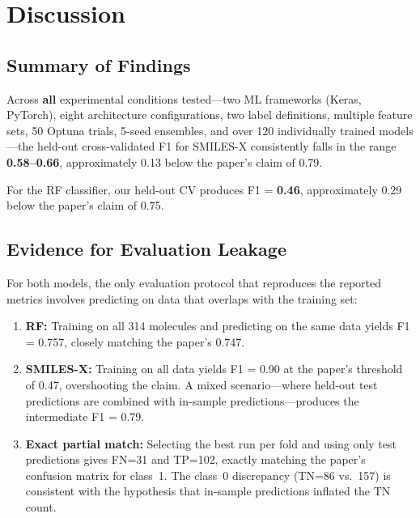 \documentclass[11pt,a4paper]{article}
\begin{document}
\section{Discussion}

\subsection{Summary of Findings}

Across \textbf{all} experimental conditions tested---two ML frameworks (Keras, PyTorch), eight architecture configurations, two label definitions, multiple feature sets, 50 Optuna trials, 5-seed ensembles, and over 120 individually trained models---the held-out cross-validated F1 for SMILES-X consistently falls in the range \textbf{0.58--0.66}, approximately 0.13 below the paper's claim of 0.79.

For the RF classifier, our held-out CV produces F1 = \textbf{0.46}, approximately 0.29 below the paper's claim of 0.75.

\subsection{Evidence for Evaluation Leakage}

For both models, the only evaluation protocol that reproduces the reported metrics involves predicting on data that overlaps with the training set:

\begin{enumerate}[nosep]
    \item \textbf{RF:} Training on all 314 molecules and predicting on the same data yields F1 = 0.757, closely matching the paper's 0.747.
    \item \textbf{SMILES-X:} Training on all data yields F1 = 0.90 at the paper's threshold of 0.47, overshooting the claim. A mixed scenario---where held-out test predictions are combined with in-sample predictions---produces the intermediate F1 = 0.79.
    \item \textbf{Exact partial match:} Selecting the best run per fold and using only test predictions gives FN=31 and TP=102, exactly matching the paper's confusion matrix for class~1. The class~0 discrepancy (TN=86 vs.\ 157) is consistent with the hypothesis that in-sample predictions inflated the TN count.
\end{enumerate}
\end{document}
